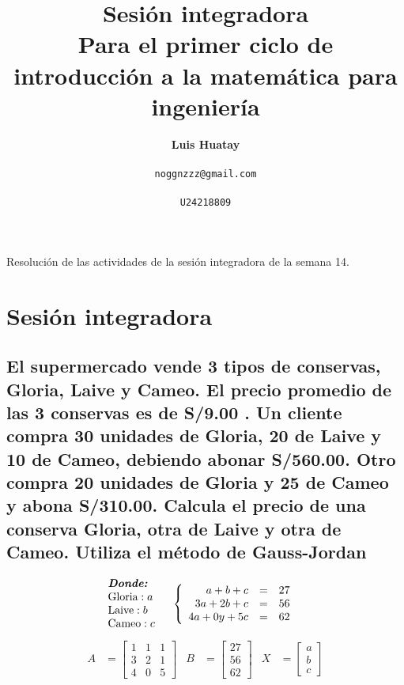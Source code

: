 \documentclass[10pt, a4paper]{article}
\title{\textbf{Sesión integradora} \\ 
\vspace{0.5cm}
\large \textbf{Para el primer ciclo de introducción a la matemática para ingeniería}}
\author{\textbf{Luis Huatay}\\\\\texttt{noggnzzz@gmail.com}\\\\\texttt{U24218809}}
\begin{document}
\maketitle
\begin{center}
Resolución de las actividades de la sesión integradora de la semana 14.
\end{center}
\restoregeometry

\newpage
{}


\section{Sesión integradora}
\subsection{El supermercado vende 3 tipos de conservas, Gloria, Laive y Cameo. El precio promedio de las 3 conservas es de S/9.00 . Un cliente compra 30 unidades de Gloria, 20 de Laive y 10 de Cameo, debiendo abonar S/560.00. Otro compra 20 unidades de Gloria y 25 de Cameo y abona S/310.00. Calcula el precio de una conserva Gloria, otra de Laive y otra de Cameo. Utiliza el método de Gauss-Jordan}
\vspace{-0.5cm}
\begin{align*}
  &\begin{array}{l}
      \textit{\textbf{Donde:}}\\
      \text{Gloria}: a\\
      \text{Laive}: b\\
      \text{Cameo}: c\\
  \end{array}
  \quad
  \left\{
  \begin{array}{rcl}
      a + b + c &= &27\\
      3a + 2b + c &= &56\\
      4a + 0y + 5c &= &62
  \end{array}
  \right.
\end{align*}
  \begin{align*}
    A &= \begin{bmatrix}
      1 & 1 & 1\\
      3 & 2 & 1\\
      4 & 0 & 5
    \end{bmatrix}&
    B &= \begin{bmatrix}
      27\\
      56\\
      62
    \end{bmatrix}&
    X &= \begin{bmatrix}
      a\\
      b\\
      c
    \end{bmatrix}
  \end{align*}
\end{document}
